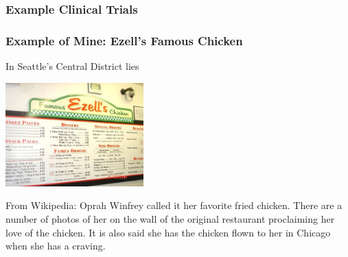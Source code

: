 \documentclass[handout]{beamer}
\newcommand{\blue}[1]{\textcolor{blue2}{#1}}
\begin{document}
\begin{frame}
\frametitle{Example Clinical Trials}

%
%
%

\end{frame}


\begin{frame}
\frametitle{Example of Mine: Ezell's Famous Chicken}
In Seattle's Central District lies
\begin{center}
\includegraphics[height=4cm]{figure/ezells.jpg}
\end{center}

\pause From Wikipedia: Oprah Winfrey called it her favorite fried chicken. There are a number of photos of her on the wall of the original restaurant proclaiming her love of the chicken. It is also said she has the chicken flown to her in Chicago when she has a craving.

\end{frame}
\end{document}
